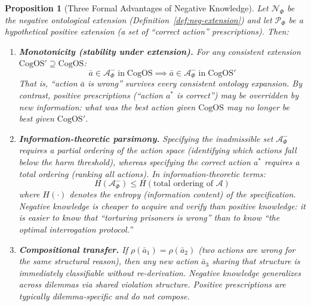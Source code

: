 \documentclass[11pt]{article}
\newtheorem{proposition}{Proposition}
\newcommand{\CogOS}{\text{CogOS}}
\begin{document}
\begin{proposition}[Three Formal Advantages of Negative Knowledge]
\label{prop:neg-advantages}
Let $\mathcal{N}_\Phi$ be the negative ontological extension
(Definition~\ref{def:neg-extension}) and let $\mathcal{P}_\Phi$ be a
hypothetical positive extension (a set of ``correct action'' prescriptions).
Then:
\begin{enumerate}
\item[(a)] \textbf{Monotonicity (stability under extension).} For any
      consistent extension $\CogOS' \supseteq \CogOS$:
      \begin{equation}
      \bar{a} \in \mathcal{A}^-_\Phi \;\text{in}\; \CogOS
      \implies
      \bar{a} \in \mathcal{A}^-_\Phi \;\text{in}\; \CogOS'
      \end{equation}
      That is, ``action $\bar{a}$ is wrong'' survives every consistent
      ontology expansion. By contrast, positive prescriptions (``action $a^*$
      is correct'') may be overridden by new information: what was the best
      action given $\CogOS$ may no longer be best given $\CogOS'$.

\item[(b)] \textbf{Information-theoretic parsimony.} Specifying the
      inadmissible set $\mathcal{A}^-_\Phi$ requires a \textit{partial}
      ordering of the action space (identifying which actions fall below the
      harm threshold), whereas specifying the correct action $a^*$ requires a
      \textit{total} ordering (ranking all actions). In information-theoretic
      terms:
      \begin{equation}
      H(\mathcal{A}^-_\Phi) \leq H(\text{total ordering of } \mathcal{A})
      \end{equation}
      where $H(\cdot)$ denotes the entropy (information content) of the
      specification. Negative knowledge is \textit{cheaper to acquire and
      verify} than positive knowledge: it is easier to know that ``torturing
      prisoners is wrong'' than to know ``the optimal interrogation protocol.''

\item[(c)] \textbf{Compositional transfer.} If $\rho(\bar{a}_1) =
      \rho(\bar{a}_2)$ (two actions are wrong for the same structural reason),
      then any new action $\bar{a}_3$ sharing that structure is immediately
      classifiable without re-derivation. Negative knowledge
      \textit{generalizes} across dilemmas via shared violation structure.
      Positive prescriptions are typically dilemma-specific and do not compose.
\end{enumerate}
\end{proposition}
\end{document}
